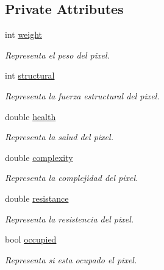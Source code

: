 \subsection*{Private Attributes}
\begin{DoxyCompactItemize}
\item 
int \hyperlink{classPixel_a5d9937eb8e6eceb168897c6731dcd355}{weight}\hypertarget{classPixel_a5d9937eb8e6eceb168897c6731dcd355}{}\label{classPixel_a5d9937eb8e6eceb168897c6731dcd355}

\begin{DoxyCompactList}\small\item\em Representa el peso del pixel. \end{DoxyCompactList}\item 
int \hyperlink{classPixel_af9fdd5fa35df9202f207c370dcfdf870}{structural}\hypertarget{classPixel_af9fdd5fa35df9202f207c370dcfdf870}{}\label{classPixel_af9fdd5fa35df9202f207c370dcfdf870}

\begin{DoxyCompactList}\small\item\em Representa la fuerza estructural del pixel. \end{DoxyCompactList}\item 
double \hyperlink{classPixel_ab162d86d990e6f5eb51f8856625acfc1}{health}\hypertarget{classPixel_ab162d86d990e6f5eb51f8856625acfc1}{}\label{classPixel_ab162d86d990e6f5eb51f8856625acfc1}

\begin{DoxyCompactList}\small\item\em Representa la salud del pixel. \end{DoxyCompactList}\item 
double \hyperlink{classPixel_a87b1c00638b0de09854d358cbc7dff0e}{complexity}\hypertarget{classPixel_a87b1c00638b0de09854d358cbc7dff0e}{}\label{classPixel_a87b1c00638b0de09854d358cbc7dff0e}

\begin{DoxyCompactList}\small\item\em Representa la complejidad del pixel. \end{DoxyCompactList}\item 
double \hyperlink{classPixel_a38a5b7fbdf41a8f9bfca98867efb5ba4}{resistance}\hypertarget{classPixel_a38a5b7fbdf41a8f9bfca98867efb5ba4}{}\label{classPixel_a38a5b7fbdf41a8f9bfca98867efb5ba4}

\begin{DoxyCompactList}\small\item\em Representa la resistencia del pixel. \end{DoxyCompactList}\item 
bool \hyperlink{classPixel_a6c4083dd11895eb4648951d3242a591b}{occupied}\hypertarget{classPixel_a6c4083dd11895eb4648951d3242a591b}{}\label{classPixel_a6c4083dd11895eb4648951d3242a591b}

\begin{DoxyCompactList}\small\item\em Representa si esta ocupado el pixel. \end{DoxyCompactList}\end{DoxyCompactItemize}


